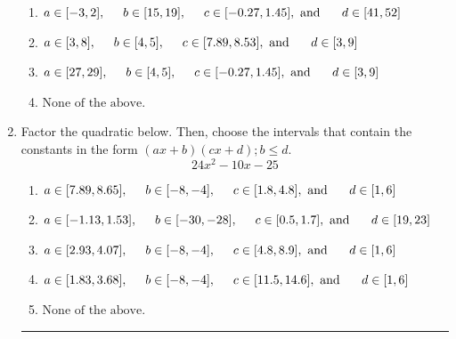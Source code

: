 \documentclass[14pt]{extbook}
\newcommand{\litem}[1]{\item#1\hspace*{-1cm}\rule{\textwidth}{0.4pt}}
\begin{document}
\begin{enumerate}
{\begin{enumerate}[label=\Alph*.]
\item \( a \in [-3, 2], \hspace*{5mm} b \in [15, 19], \hspace*{5mm} c \in [-0.27, 1.45], \text{ and } \hspace*{5mm} d \in [41, 52] \)
\item \( a \in [3, 8], \hspace*{5mm} b \in [4, 5], \hspace*{5mm} c \in [7.89, 8.53], \text{ and } \hspace*{5mm} d \in [3, 9] \)
\item \( a \in [27, 29], \hspace*{5mm} b \in [4, 5], \hspace*{5mm} c \in [-0.27, 1.45], \text{ and } \hspace*{5mm} d \in [3, 9] \)
\item \( \text{None of the above.} \)

\end{enumerate} }
\litem{
Factor the quadratic below. Then, choose the intervals that contain the constants in the form $(ax+b)(cx+d); b \leq d.$\[ 24x^{2} -10 x -25 \]\begin{enumerate}[label=\Alph*.]
\item \( a \in [7.89, 8.65], \hspace*{5mm} b \in [-8, -4], \hspace*{5mm} c \in [1.8, 4.8], \text{ and } \hspace*{5mm} d \in [1, 6] \)
\item \( a \in [-1.13, 1.53], \hspace*{5mm} b \in [-30, -28], \hspace*{5mm} c \in [0.5, 1.7], \text{ and } \hspace*{5mm} d \in [19, 23] \)
\item \( a \in [2.93, 4.07], \hspace*{5mm} b \in [-8, -4], \hspace*{5mm} c \in [4.8, 8.9], \text{ and } \hspace*{5mm} d \in [1, 6] \)
\item \( a \in [1.83, 3.68], \hspace*{5mm} b \in [-8, -4], \hspace*{5mm} c \in [11.5, 14.6], \text{ and } \hspace*{5mm} d \in [1, 6] \)
\item \( \text{None of the above.} \)


\end{enumerate}}
\end{enumerate}
\end{document}
